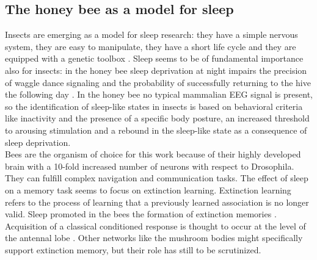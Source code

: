   \subsection{The honey bee as a model for sleep}
  Insects are emerging as a model for sleep research: they have a simple nervous system, they are easy to manipulate, they have a short life cycle and they are equipped with a genetic toolbox \cite{sleep-mammals}.
  Sleep seems to be of fundamental importance also for insects: in the honey bee sleep deprivation at night impairs the precision of waggle dance signaling \cite{waggle-sleep-deprivation} and the probability of successfully returning to the hive the following day \cite{sleep-honeybee-consolidation}.
  In the honey bee no typical mammalian EEG signal is present, so the identification of sleep-like states in insects is based on behavioral criteria like inactivity and the presence of a specific body posture, an increased threshold to arousing stimulation and a rebound in the sleep-like state as a consequence of sleep deprivation.\\
  Bees are the organism of choice for this work because of their highly developed brain with a 10-fold increased number of neurons with respect to Drosophila.
  They can fulfill complex navigation and communication tasks.
  The effect of sleep on a memory task seems to focus on extinction learning.
  Extinction learning refers to the process of learning that a previously learned association is no longer valid.
  Sleep promoted in the bees the formation of extinction memories \cite{bee-extinction-memory}.
  Acquisition of a classical conditioned response is thought to occur at the level of the antennal lobe \cite{memory-acquisition-al}.
  Other networks like the mushroom bodies might specifically support extinction memory, but their role has still to be scrutinized.

